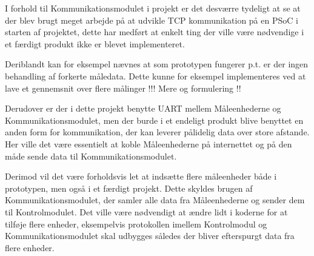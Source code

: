 
I forhold til Kommunikationsmodulet i projekt er det desværre tydeligt at se at der blev brugt meget arbejde på at udvikle TCP kommunikation på en PSoC i starten af projektet, dette har medført at enkelt ting der ville være nødvendige i et færdigt produkt ikke er blevet implementeret. 

Deriblandt kan for eksempel nævnes at som prototypen fungerer p.t. er der ingen behandling af forkerte måledata. Dette kunne for eksempel implementeres ved at lave et gennemsnit over flere målinger
!!! Mere og formulering !!

Derudover er der i dette projekt benytte UART mellem Måleenhederne og Kommunikationsmodulet, men der burde i et endeligt produkt blive benyttet en anden form for kommunikation, der kan leverer pålidelig data over store afstande. Her ville det være essentielt at koble Måleenhederne på internettet og på den måde sende data til Kommunikationsmodulet. 

Derimod vil det være forholdsvis let at indsætte flere måleenheder både i prototypen, men også i et færdigt projekt. Dette skyldes brugen af Kommunikationsmodulet, der samler alle data fra Måleenhederne og sender dem til Kontrolmodulet. Det ville være nødvendigt at ændre lidt i koderne for at tilføje flere enheder, eksempelvis protokollen imellem Kontrolmodul og Kommunikationsmodulet skal udbygges således der bliver efterspurgt data fra flere enheder. 


